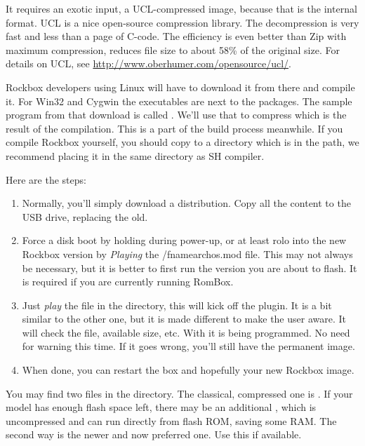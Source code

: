 It requires an exotic input, a UCL-compressed image, because that is the internal 
format. UCL is a nice open-source compression library. The decompression is very 
fast and less than a page of C-code. The efficiency is even better than Zip with 
maximum compression, reduces file size to about 58\% of the original size. For 
details on UCL, see \url{http://www.oberhumer.com/opensource/ucl/}.

Rockbox developers using Linux will have to download it from there and compile 
it. For Win32 and Cygwin the executables are next to the packages. The sample 
program from that download is called . We'll use that to compress 
 which is the result of the compilation. This is a part of the
build process meanwhile. If you compile Rockbox yourself, you should copy 
 to a directory which is in the path, we recommend placing it in 
the same directory as SH compiler.


Here are the steps:

\begin{enumerate}
\item Normally, you'll simply download a  distribution. Copy all the 
  content to the USB drive, replacing the old.
\item Force a disk boot by holding  during power-up, or at least rolo into
  the new Rockbox version by \emph{Playing} the /fname{archos.mod} file. This may not always be necessary, but it is better to first run the 
  version you are about to flash. It is required if you are currently running 
  RomBox.
\item Just \emph{play} the  file in the  directory, 
  this will kick off the  plugin. It is a bit similar 
  to the other one, but it is made different to make the user aware. It will check
  the file, available size, etc. With  it is being programmed. No need for 
  warning this time. If it goes wrong, you'll still have the permanent image.
\item When done, you can restart the box and hopefully your new Rockbox image.
\end{enumerate}

You may find two  files in the  directory. The 
classical, compressed one is . If your model has enough flash 
space left, there may be an additional , which is uncompressed 
and can run directly from flash ROM, saving some RAM. The second way is the newer
and now preferred one. Use this if available.

